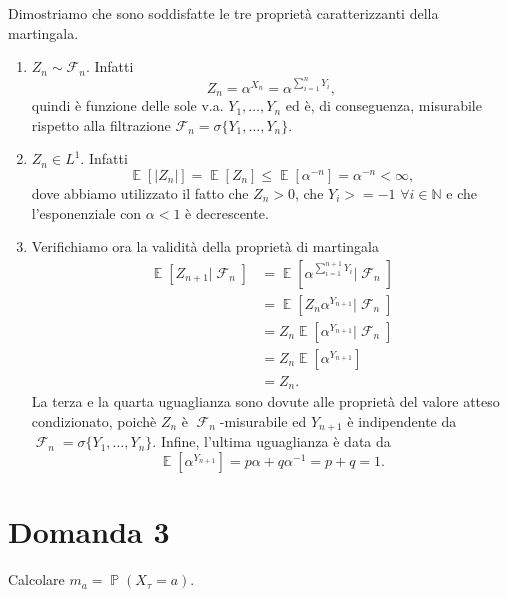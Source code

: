 \documentclass[
	12pt, %
]{fphw}
\DeclareMathOperator{\Ev}{\mathbb{E}}%
\DeclareMathOperator{\Pro}{\mathbb{P}}%
\DeclareMathOperator{\F}{\mathcal{F}}%
\begin{document}
Dimostriamo che sono soddisfatte le tre proprietà caratterizzanti della martingala.
\begin{enumerate}
    \item $Z_n \sim \mathcal{F}_n$. Infatti
        \begin{equation*}
            Z_n = \alpha^{X_n} = \alpha^{\sum_{i=1}^n Y_i},
        \end{equation*}
        quindi è funzione delle sole v.a. $Y_1, \dots, Y_n$ ed è, di conseguenza, misurabile rispetto alla filtrazione $\mathcal{F}_n = \sigma\{Y_1, \dots , Y_n\}$.
    \item $Z_n \in L^1$. Infatti
        \begin{equation*}
            \Ev[|Z_n|] = \Ev[Z_n] \leq \Ev[\alpha^{-n}] = \alpha^{-n} < \infty,
        \end{equation*}
        dove abbiamo utilizzato il fatto che $Z_n > 0$, che $Y_i >= -1 $ $\forall i \in \mathbb{N}$ e che l'esponenziale con $\alpha < 1$ è decrescente.
    \item Verifichiamo ora la validità della proprietà di martingala
        \begin{equation*}
            \begin{aligned}
                \Ev[Z_{n+1} | \F_n] &= \Ev[\alpha^{\sum_{i=1}^{n+1} Y_i} | \F_n]\\
                &= \Ev[Z_n \alpha^{Y_{n+1}} | \F_n]\\
                &= Z_n \Ev[\alpha^{Y_{n+1}} | \F_n]\\
                &= Z_n \Ev[\alpha^{Y_{n+1}}] \\
                &= Z_n.
            \end{aligned}
        \end{equation*}
        La terza e la quarta uguaglianza sono dovute alle proprietà del valore atteso condizionato, poichè $Z_n$ è $\F_n$-misurabile ed $Y_{n+1}$ è indipendente da $\F_n = \sigma\{Y_1, \dots , Y_n\}$.
        Infine, l'ultima uguaglianza è data da
        \begin{equation*}
            \Ev[\alpha^{Y_{n+1}}] = p \alpha + q \alpha^{-1} = p+q = 1.
        \end{equation*}
\end{enumerate}

\newpage
\section*{Domanda 3}
\begin{problem}
	Calcolare $m_a = \Pro(X_{\tau} = a)$.
	\smallskip
\end{problem}
\end{document}
